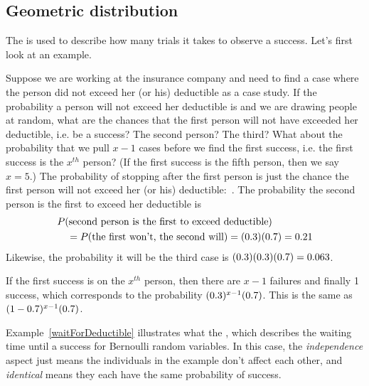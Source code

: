


\subsection{Geometric distribution}


The 
is used to describe how
many trials it takes to observe a success.
Let's first look at an example.

\begin{examplewrap}
\begin{nexample}{Suppose we are working at the insurance
    company and need to find a case where the person did
    not exceed her (or his) deductible as a case study.
    If the probability a person will not exceed her
    deductible is \insureSprob{} and we are drawing people
    at random, what are the chances that the first person
    will not have exceeded her deductible, i.e. be a success?
    The second person?
    The third?
    What about the probability that we pull $x - 1$ cases before we find
    the first success, i.e. the first success is the
    $x^{th}$ person?
    (If the first success is the fifth person, then we say $x=5$.)}
  \label{waitForDeductible}%
  The probability of stopping after the first person is just
  the chance the first person will not exceed her (or his)
  deductible:~\insureSprob{}.
The probability the second person is the first to exceed
  her deductible is  \begin{align*}
  &P(\text{second person is the first to exceed deductible})  \\
  &\quad
    = P(\text{the first won't, the second will})
    = (0.3{})(0.7{})
    = 0.21{}
  \end{align*}
  Likewise, the probability it will be the third case is
  $(0.3{})(0.3{})(0.7{})
    = 0.063$.

  If the first success is on the $x^{th}$ person,
  then there are $x-1$ failures and finally 1 success,
  which corresponds to the probability
  $(0.3{})^{x-1}(0.7{})$.
  This is the same as
  $(1-0.7{})^{x-1}(0.7{})$.
\end{nexample}
\end{examplewrap}


Example~\ref{waitForDeductible} illustrates what the
,
which describes the waiting
time until a success for
Bernoulli random variables.
In this case, the \emph{independence} aspect just means
the individuals in the example don't affect each other,
and \emph{identical} means they each have the same probability
of success.

